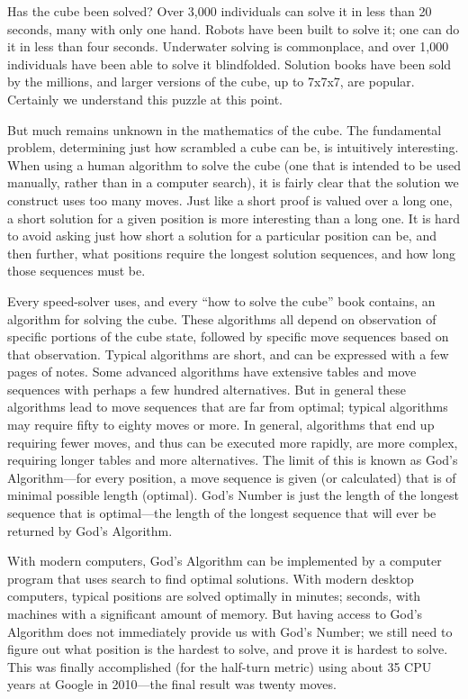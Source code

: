 Has the cube been solved?  Over 3,000 individuals can solve it in
less than 20 seconds, many with only one hand.  Robots have been
built to solve it; one can do it in less than four seconds.
Underwater solving is commonplace, and over 1,000 individuals
have been able to solve it blindfolded.  Solution books have been
sold by the millions, and larger versions of the cube, up to 7x7x7,
are popular.  Certainly we understand this puzzle at this point.

But much remains unknown in the mathematics of the cube.
The fundamental problem, determining just how scrambled a cube can
be, is intuitively interesting.  When using a human algorithm
to solve the cube (one that is intended to be used manually,
rather than in a computer search), it is fairly clear that the solution
we construct uses too many moves.  Just like a short proof is valued
over a long one, a short solution for a given position is more
interesting than a long one.  It is hard to avoid asking just how
short a solution for a particular position can be, and then further,
what positions require the longest solution sequences, and how long those
sequences must be.

Every speed-solver uses, and every ``how to solve the cube'' book
contains, an algorithm for solving the cube.  These algorithms all
depend on observation of specific portions of the cube state,
followed by specific move sequences based on that observation.
Typical algorithms are short, and can be expressed with a few pages
of notes.  Some advanced algorithms have extensive tables and move
sequences with perhaps a few hundred alternatives.  But in general
these algorithms lead to move sequences that are far from optimal;
typical algorithms may require fifty to eighty moves or more.  In
general, algorithms that end up requiring fewer moves, and thus can
be executed more rapidly, are more complex, requiring longer tables
and more alternatives.  The limit of this is known as God's
Algorithm---for every position, a move sequence is given (or
calculated) that is of minimal possible length (optimal).  God's
Number is just the length of the longest sequence that is optimal---the
length of the longest sequence that will ever be returned by God's
Algorithm.

With modern computers, God's Algorithm can be implemented by a
computer program that uses search to find optimal solutions.  With
modern desktop computers, typical positions are solved optimally in
minutes; seconds, with machines with a significant amount of memory.
But having access to God's Algorithm does not immediately provide
us with God's Number; we still need to figure out what position is
the hardest to solve, and prove it is hardest to solve.  This was
finally accomplished (for the half-turn metric) using about 35 CPU
years at Google in 2010---the final result was twenty moves.

